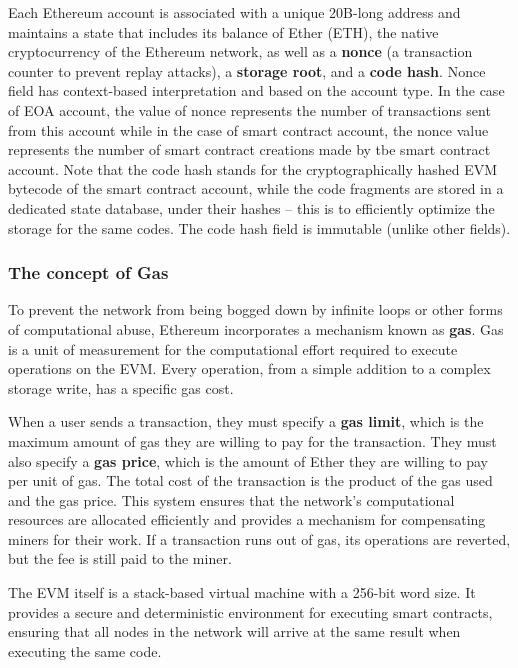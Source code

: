 Each Ethereum account is associated with a unique 20B-long address and maintains
a state that includes its balance of Ether (ETH), the native
cryptocurrency of the Ethereum network, as well as a \textbf{nonce} (a
transaction counter to prevent replay attacks), a \textbf{storage root},
and a \textbf{code hash}.
Nonce field has context-based interpretation and based on the account type.
In the case of EOA account, the value of nonce represents the number of transactions sent from this account while in the case of smart contract account, the nonce value represents the number of smart contract creations made by tbe smart contract account.
Note that the code hash stands for the cryptographically hashed EVM bytecode of the smart contract account, while the code fragments are stored in a dedicated state database, under their hashes -- this is to efficiently optimize the storage for the same codes. The code hash field is immutable (unlike other fields).

\subsubsection{The concept of Gas}\label{gas-and-the-ethereum-virtual-machine-evm}

To prevent the network from being bogged down by infinite loops or other
forms of computational abuse, Ethereum incorporates a mechanism known as
\textbf{gas}. Gas is a unit of measurement for the computational effort
required to execute operations on the EVM. Every operation, from a
simple addition to a complex storage write, has a specific gas cost.

When a user sends a transaction, they must specify a \textbf{gas limit},
which is the maximum amount of gas they are willing to pay for the
transaction. They must also specify a \textbf{gas price}, which is the
amount of Ether they are willing to pay per unit of gas. The total cost
of the transaction is the product of the gas used and the gas price.
This system ensures that the network's computational resources are
allocated efficiently and provides a mechanism for compensating miners
for their work. If a transaction runs out of gas, its operations are
reverted, but the fee is still paid to the miner.

The EVM itself is a stack-based virtual machine with a 256-bit word
size. It provides a secure and deterministic environment for executing
smart contracts, ensuring that all nodes in the network will arrive at
the same result when executing the same code.

